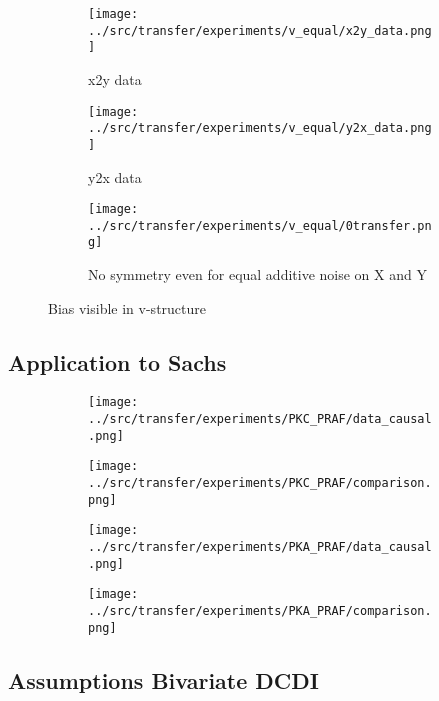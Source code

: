 \documentclass{article}
\begin{document}
\begin{figure}[H]
    \centering
    \begin{subfigure}{.49\linewidth}
        \centering
        \texttt{[image: ../src/transfer/experiments/v\_equal/x2y\_data.png]}
        \caption{x2y data}
    \end{subfigure}
    \begin{subfigure}{.49\linewidth}
        \centering
        \texttt{[image: ../src/transfer/experiments/v\_equal/y2x\_data.png]}
        \caption{y2x data}
    \end{subfigure}
    \hfill
    \begin{subfigure}{\linewidth}
        \centering
        \texttt{[image: ../src/transfer/experiments/v\_equal/0transfer.png]}
        \caption{No symmetry even for equal additive noise on X and Y}
    \end{subfigure}
    \hfill
    \caption{Bias visible in v-structure}
\end{figure}

\clearpage
\subsection{Application to Sachs}

\begin{figure}[H]
    \centering
    \begin{subfigure}{.49\linewidth}
        \centering
        \texttt{[image: ../src/transfer/experiments/PKC\_PRAF/data\_causal.png]}
    \end{subfigure}
    \begin{subfigure}{.49\linewidth}
        \centering
        \texttt{[image: ../src/transfer/experiments/PKC\_PRAF/comparison.png]}
    \end{subfigure}
    \hfill
    \begin{subfigure}{.49\linewidth}
        \centering
        \texttt{[image: ../src/transfer/experiments/PKA\_PRAF/data\_causal.png]}
    \end{subfigure}
    \begin{subfigure}{.49\linewidth}
        \centering
        \texttt{[image: ../src/transfer/experiments/PKA\_PRAF/comparison.png]}
    \end{subfigure}
\end{figure}


\subsection{Assumptions Bivariate DCDI}
\end{document}
